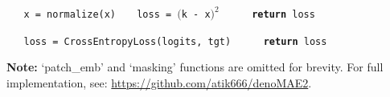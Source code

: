 \begin{algorithm}[htbp]
\begin{algorithmic}[1]
    
      \Comment{\textcolor{green!60!black}{ reconstruction loss}}
        \State \texttt{~~~x = normalize(x)}  \Comment{\textcolor{green!60!black}{ normalize patches}}
        \State \texttt{~~~loss = $($k - x$)^2$}  \Comment{\textcolor{green!60!black}{ MSE loss}}
        \State \texttt{{\bf ~~~~~return} loss}
    \Statex


      \Comment{\textcolor{green!60!black}{ classification loss}}
        \State \texttt{~~~loss = CrossEntropyLoss(logits, tgt)}
        \State \texttt{{\bf ~~~~~return} loss}

    \Statex \text{}

\end{algorithmic}

\textbf{Note:} `patch\_emb' and `masking' functions are omitted for brevity. For full implementation, see: \url{https://github.com/atik666/denoMAE2}.

\end{algorithm}